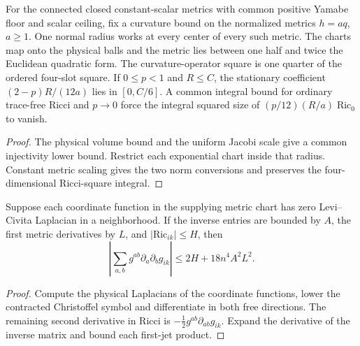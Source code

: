 \begin{proposition}
\label{prop:ed48-normal}
\leanok
For the connected closed constant-scalar metrics with common positive Yamabe floor
and scalar ceiling, fix a curvature bound on the normalized metrics $h=aq$,
$a\ge1$. One normal radius works at every center of every such metric.
The charts map onto the physical balls and the metric lies between one
half and twice the Euclidean quadratic form. The curvature-operator square
is one quarter of the ordered four-slot square. If $0\le p<1$ and $R\le C$,
the stationary coefficient $(2-p)R/(12a)$ lies in $[0,C/6]$.
A common integral bound for ordinary trace-free Ricci and $p\to0$
force the integral squared size of $(p/12)(R/a)\operatorname{Ric}_0$ to vanish.
\end{proposition}
\begin{proof}
\leanok
The physical volume bound and the uniform Jacobi scale give a common
injectivity lower bound. Restrict each exponential chart inside that
radius. Constant metric scaling gives the two norm conversions and
preserves the four-dimensional Ricci-square integral.
\end{proof}

\begin{proposition}
\label{prop:ed48-harmonic}
\leanok
Suppose each coordinate function in the supplying metric chart has zero
Levi--Civita Laplacian in a neighborhood. If the inverse entries are bounded by $A$,
the first metric derivatives by $L$, and $|\mathrm{Ric}_{ik}|\le H$, then
\[
 \left|\sum_{a,b}g^{ab}\partial_a\partial_b g_{ik}\right|
 \le 2H+18 n^4 A^2 L^2 .
\]
\end{proposition}
\begin{proof}
\leanok
Compute the physical Laplacians of the coordinate functions, lower the
contracted Christoffel symbol and differentiate in both free directions.
The remaining second derivative in Ricci is $-\tfrac12 g^{ab}\partial_{ab}g_{ik}$.
Expand the derivative of the inverse matrix and bound each first-jet product.
\end{proof}

